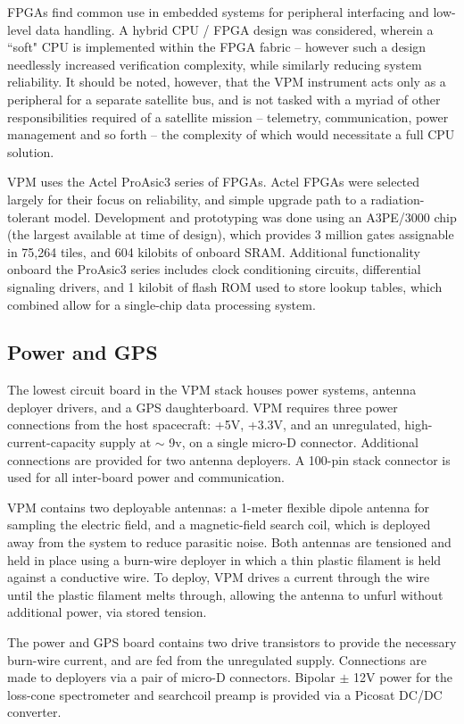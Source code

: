 FPGAs find common use in embedded systems for peripheral interfacing and low-level data handling. A hybrid CPU / FPGA design was considered, wherein a ``soft" CPU is implemented within the FPGA fabric -- however such a design needlessly increased verification complexity, while similarly reducing system reliability. It should be noted, however, that the VPM instrument acts only as a peripheral for a separate satellite bus, and is not tasked with a myriad of other responsibilities required of a satellite mission -- telemetry, communication, power management and so forth -- the complexity of which would necessitate a full CPU solution.

VPM uses the Actel ProAsic3 series of FPGAs. Actel FPGAs were selected largely for their focus on reliability, and simple upgrade path to a radiation-tolerant model. Development and prototyping was done using an A3PE/3000 chip (the largest available at time of design), which provides 3 million gates assignable in 75,264 tiles, and 604 kilobits of onboard SRAM. Additional functionality onboard the ProAsic3 series includes clock conditioning circuits, differential signaling drivers, and 1 kilobit of flash ROM used to store lookup tables, which combined allow for a single-chip data processing system. %


\subsection{Power and GPS}
The lowest circuit board in the VPM stack houses power systems, antenna deployer drivers, and a GPS daughterboard. VPM requires three power connections from the host spacecraft: +5V, +3.3V, and an unregulated, high-current-capacity supply at $\sim$ 9v, on a single micro-D connector. Additional connections are provided for two antenna deployers. A 100-pin stack connector is used for all inter-board power and communication.

VPM contains two deployable antennas: a 1-meter flexible dipole antenna for sampling the electric field, and a magnetic-field search coil, which is deployed away from the system to reduce parasitic noise. Both antennas are tensioned and held in place using a burn-wire deployer in which a thin plastic filament is held against a conductive wire. To deploy, VPM drives a current through the wire until the plastic filament melts through, allowing the antenna to unfurl without additional power, via stored tension.

The power and GPS board contains two drive transistors to provide the necessary burn-wire current, and are fed from the unregulated supply. Connections are made to deployers via a pair of micro-D connectors. Bipolar $\pm$ 12V power for the loss-cone spectrometer and searchcoil preamp is provided via a Picosat DC/DC converter. %

